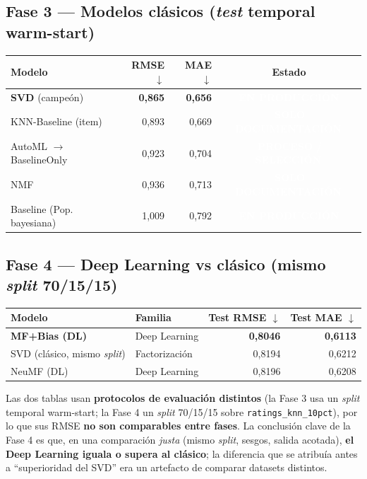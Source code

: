 \documentclass[11pt,a4paper]{article}
\newcommand{\code}[1]{\textcolor{omnidark}{\texttt{#1}}}
\newcommand{\enprod}{\textcolor{white}{\colorbox{omniaccent}{\scriptsize\bfseries\,EN PRODUCCIÓN\,}}}
\newcommand{\noserv}{\textcolor{white}{\colorbox{omnigray}{\scriptsize\bfseries\,SOLO DOCUMENTACIÓN\,}}}
\newcommand{\proceso}{\textcolor{white}{\colorbox{omnigold}{\scriptsize\bfseries\,PROCESO / SELECCIÓN\,}}}
\begin{document}
\subsection{Fase 3 — Modelos clásicos (\textit{test} temporal warm-start)}
\begin{center}
\small
\begin{tabularx}{\textwidth}{@{}X r r c@{}}
\toprule
\textbf{Modelo} & \textbf{RMSE} $\downarrow$ & \textbf{MAE} $\downarrow$ & \textbf{Estado} \\
\midrule
\textbf{SVD} (campeón) & \textbf{0,865} & \textbf{0,656} & \enprod \\
KNN-Baseline (item) & 0,893 & 0,669 & \noserv \\
AutoML $\rightarrow$ BaselineOnly & 0,923 & 0,704 & \proceso \\
NMF & 0,936 & 0,713 & \noserv \\
Baseline (Pop. bayesiana) & 1,009 & 0,792 & \enprod \\
\bottomrule
\end{tabularx}
\end{center}

\subsection{Fase 4 — Deep Learning vs clásico (mismo \textit{split} 70/15/15)}
\begin{center}
\small
\begin{tabularx}{\textwidth}{@{}X l r r@{}}
\toprule
\textbf{Modelo} & \textbf{Familia} & \textbf{Test RMSE} $\downarrow$ & \textbf{Test MAE} $\downarrow$ \\
\midrule
\textbf{MF+Bias (DL)} & Deep Learning & \textbf{0,8046} & \textbf{0,6113} \\
SVD (clásico, mismo \textit{split}) & Factorización & 0,8194 & 0,6212 \\
NeuMF (DL) & Deep Learning & 0,8196 & 0,6208 \\
\bottomrule
\end{tabularx}
\end{center}

\begin{infobox}
Las dos tablas usan \textbf{protocolos de evaluación distintos} (la Fase 3 usa un \textit{split} temporal warm-start; la Fase 4 un \textit{split} 70/15/15 sobre \code{ratings\_knn\_10pct}), por lo que sus RMSE \textbf{no son comparables entre fases}. La conclusión clave de la Fase 4 es que, en una comparación \emph{justa} (mismo \textit{split}, sesgos, salida acotada), \textbf{el Deep Learning iguala o supera al clásico}; la diferencia que se atribuía antes a ``superioridad del SVD'' era un artefacto de comparar datasets distintos.
\end{infobox}
\end{document}
